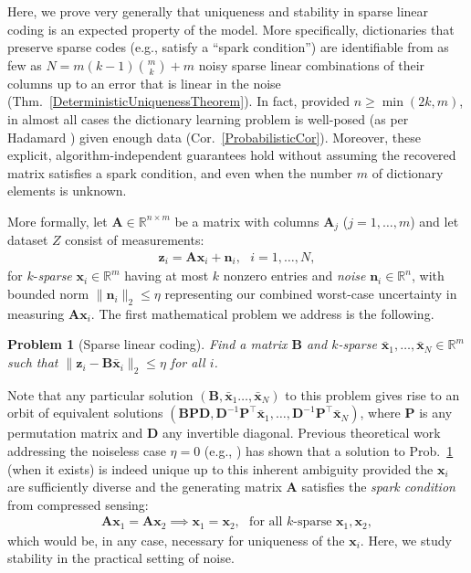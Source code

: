 \documentclass[9pt,twocolumn]{pnas-new}
\newtheorem{problem}{Problem}
\begin{document}
Here, we prove very generally that uniqueness and stability in sparse linear coding is an expected property of the model. 
More specifically, dictionaries that preserve sparse codes (e.g., satisfy a ``spark condition'') are identifiable from as few as \mbox{$N = m(k-1){m \choose k} + m$} noisy sparse linear combinations of their columns up to an error that is linear in the noise (Thm.~\ref{DeterministicUniquenessTheorem}). In fact, provided $n \geq \min(2k,m)$, in almost all cases the dictionary learning problem is well-posed (as per Hadamard \cite{Hadamard1902}) given enough data (Cor.~\ref{ProbabilisticCor}). Moreover, these explicit, algorithm-independent guarantees hold without assuming the recovered matrix satisfies a spark condition, and even when the number $m$ of dictionary elements is unknown.

More formally, let $\mathbf{A} \in \mathbb R^{n \times m}$ be a matrix with columns $\mathbf{A}_j$ ($j = 1,\ldots,m$) and let dataset $Z$ consist of measurements:
\begin{align}\label{LinearModel}
\mathbf{z}_i = \mathbf{A}\mathbf{x}_i + \mathbf{n}_i,\ \ \  \text{$i=1,\ldots,N$},
\end{align}
for $k$-\emph{sparse} $\mathbf{x}_i \in \mathbb{R}^m$ having at most $k$ nonzero entries and \emph{noise} $\mathbf{n}_i \in \mathbb{R}^n$, with bounded norm $\| \mathbf{n}_i \|_2 \leq  \eta$ representing our combined worst-case uncertainty in  measuring $\mathbf{A}\mathbf{x}_i$.
The first mathematical problem we address is the following.

\begin{problem}[Sparse linear coding]\label{InverseProblem}
Find a matrix $\mathbf{B}$ and $k$-sparse $\mathbf{\bar x}_1, \ldots, \mathbf{\bar x}_N \in \mathbb{R}^m$ such that $\|\mathbf{z}_i - \mathbf{B}\mathbf{\bar x}_i\|_2 \leq \eta$ for all $i$.
\end{problem}

Note that any particular solution $(\mathbf{B}, \mathbf{\bar x}_1 \ldots, \mathbf{\bar x}_N)$ to this problem gives rise to an orbit of equivalent solutions $(\mathbf{BPD}, \mathbf{D}^{-1}\mathbf{P}^{\top}\mathbf{\bar x}_1, \ldots, \mathbf{D}^{-1}\mathbf{P}^{\top}\mathbf{\bar x}_N)$, where $\mathbf{P}$ is any permutation matrix and $\mathbf{D}$ any invertible diagonal. Previous theoretical work addressing the noiseless case $\eta =0$ (e.g., \cite{li2004analysis, Georgiev05, Aharon06, Hillar15}) has shown that a solution to Prob.~\ref{InverseProblem} (when it exists) is indeed unique up to this inherent ambiguity provided the $\mathbf{x}_i$ are sufficiently diverse and the generating matrix $\mathbf{A}$ satisfies the \textit{spark condition} from compressed sensing:
\begin{align}\label{SparkCondition}
\mathbf{A}\mathbf{x}_1 = \mathbf{A}\mathbf{x}_2 \implies \mathbf{x}_1 = \mathbf{x}_2, \ \ \ \text{for all $k$-sparse } \mathbf{x}_1, \mathbf{x}_2,
\end{align}
%
which would be, in any case, necessary for uniqueness of the $\mathbf{x}_i$. Here, we study stability in the practical setting of noise.
\end{document}
